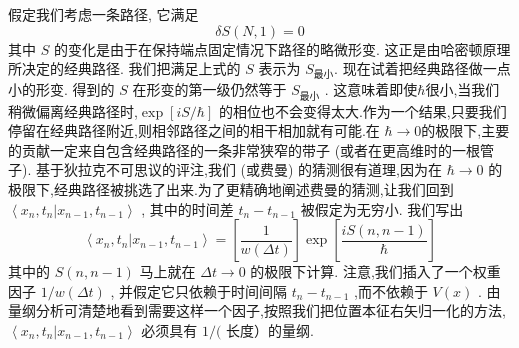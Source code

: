 \documentclass[lang=cn,newtx,10pt,scheme=chinese,thmcnt=section]{elegantbook}
\begin{document}
假定我们考虑一条路径, 它满足
\begin{equation}
	{\delta S}\left( {N,1}\right) = 0
\end{equation}
其中 $S$ 的变化是由于在保持端点固定情况下路径的略微形变. 这正是由哈密顿原理所决定的经典路径. 我们把满足上式的 $S$ 表示为 ${S}_{\text{最小}}$. 现在试着把经典路径做一点小的形变. 得到的 $S$ 在形变的第一级仍然等于 ${S}_{\text{最小}}$ . 这意味着即使$\hbar$很小,当我们稍微偏离经典路径时,$\exp\left\lbrack{{iS}/\hbar}\right\rbrack$ 的相位也不会变得太大.作为一个结果,只要我们停留在经典路径附近,则相邻路径之间的相干相加就有可能.在 $\hbar \rightarrow 0$的极限下,主要的贡献一定来自包含经典路径的一条非常狭窄的带子 (或者在更高维时的一根管子). 基于狄拉克不可思议的评注,我们 (或费曼) 的猜测很有道理,因为在 $\hbar \rightarrow 0$ 的极限下,经典路径被挑选了出来.为了更精确地阐述费曼的猜测,让我们回到 $\left\langle {{x}_{n},{t}_{n} | {x}_{n - 1},{t}_{n - 1}}\right\rangle$ , 其中的时间差 ${t}_{n} - {t}_{n - 1}$ 被假定为无穷小. 我们写出
\begin{equation}
	\left\langle {{x}_{n},{t}_{n} | {x}_{n - 1},{t}_{n - 1}}\right\rangle = \left\lbrack \frac{1}{w\left( {\Delta t}\right) }\right\rbrack \exp \left\lbrack \frac{{iS}\left( {n, n - 1}\right) }{\hbar }\right\rbrack
\end{equation}
其中的 $S\left( {n, n - 1}\right)$ 马上就在 ${\Delta t} \rightarrow 0$ 的极限下计算. 注意,我们插入了一个权重因子 $1/w\left( {\Delta t}\right)$ , 并假定它只依赖于时间间隔 ${t}_{n} - {t}_{n - 1}$ ,而不依赖于 $V\left( x\right)$ . 由量纲分析可清楚地看到需要这样一个因子,按照我们把位置本征右矢归一化的方法, $\left\langle {{x}_{n},{t}_{n} | {x}_{n - 1},{t}_{n - 1}}\right\rangle$ 必须具有 $1/($ 长度）的量纲.
\end{document}
